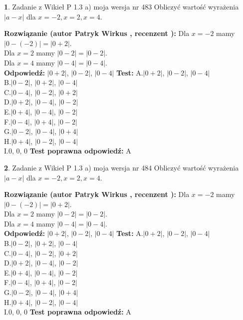 \documentclass[12pt, a4paper]{article}
\theoremstyle{definition} %
\newtheorem{zad}{}
\newcommand{\zadStart}[1]{\begin{zad}#1\newline}
\newcommand{\zadStop}{\end{zad}}
\newcommand{\rozwStart}[2]{\noindent \textbf{Rozwiązanie (autor #1 , recenzent #2): }\newline}
\newcommand{\rozwStop}{\newline}
\newcommand{\odpStart}{\noindent \textbf{Odpowiedź:}\newline}
\newcommand{\odpStop}{\newline}
\newcommand{\testStart}{\noindent \textbf{Test:}\newline}
\newcommand{\testStop}{\newline}
\newcommand{\kluczStart}{\noindent \textbf{Test poprawna odpowiedź:}\newline}
\newcommand{\kluczStop}{\newline}
\begin{document}
\zadStart{Zadanie z Wikieł P 1.3 a) moja wersja nr 483}
Obliczyć wartość wyrażenia $|a - x|$ dla $x=-2,x=2,x=4$.
\zadStop
\rozwStart{Patryk Wirkus}{}
Dla $x = -2$ mamy $|0 - (-2)| = |0 + 2|$.\\
Dla $x = 2$ mamy $|0 - 2| = |0 - 2|$.\\
Dla $x = 4$ mamy $|0 - 4| = |0 - 4|$.\\
\rozwStop
\odpStart
$|0 + 2|$, $|0 - 2|$, $|0 - 4|$
\odpStop
\testStart
A.$|0 + 2|$, $|0 - 2|$, $|0 - 4|$\\
B.$|0 - 2|$, $|0 + 2|$, $|0 - 4|$\\
C.$|0 - 4|$, $|0 - 2|$, $|0 + 2|$\\
D.$|0 + 2|$, $|0 - 4|$, $|0 - 2|$\\
E.$|0 + 4|$, $|0 - 4|$, $|0 - 2|$\\
F.$|0 - 4|$, $|0 + 4|$, $|0 - 2|$\\
G.$|0 - 2|$, $|0 - 4|$, $|0 + 4|$\\
H.$|0 + 4|$, $|0 - 2|$, $|0 - 4|$\\
I.$0$, $0$, $0$
\testStop
\kluczStart
A
\kluczStop



\zadStart{Zadanie z Wikieł P 1.3 a) moja wersja nr 484}
Obliczyć wartość wyrażenia $|a - x|$ dla $x=-2,x=2,x=4$.
\zadStop
\rozwStart{Patryk Wirkus}{}
Dla $x = -2$ mamy $|0 - (-2)| = |0 + 2|$.\\
Dla $x = 2$ mamy $|0 - 2| = |0 - 2|$.\\
Dla $x = 4$ mamy $|0 - 4| = |0 - 4|$.\\
\rozwStop
\odpStart
$|0 + 2|$, $|0 - 2|$, $|0 - 4|$
\odpStop
\testStart
A.$|0 + 2|$, $|0 - 2|$, $|0 - 4|$\\
B.$|0 - 2|$, $|0 + 2|$, $|0 - 4|$\\
C.$|0 - 4|$, $|0 - 2|$, $|0 + 2|$\\
D.$|0 + 2|$, $|0 - 4|$, $|0 - 2|$\\
E.$|0 + 4|$, $|0 - 4|$, $|0 - 2|$\\
F.$|0 - 4|$, $|0 + 4|$, $|0 - 2|$\\
G.$|0 - 2|$, $|0 - 4|$, $|0 + 4|$\\
H.$|0 + 4|$, $|0 - 2|$, $|0 - 4|$\\
I.$0$, $0$, $0$
\testStop
\kluczStart
A
\kluczStop
\end{document}
